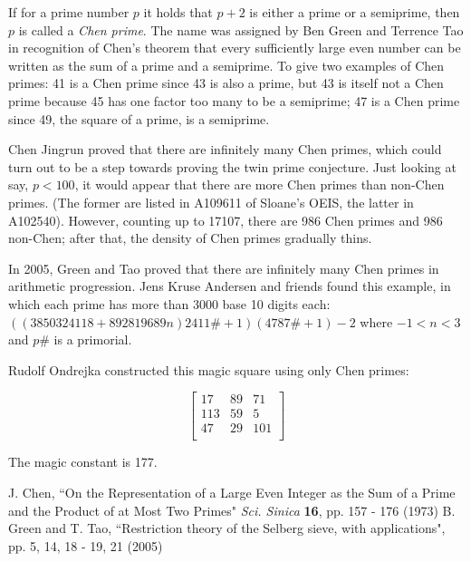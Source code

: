 \documentclass[12pt]{article}
\begin{document}
If for a prime number $p$ it holds that $p + 2$ is either a prime or a semiprime, then $p$ is called a {\em Chen prime}. The name was assigned by Ben Green and Terrence Tao in recognition of Chen's theorem that every sufficiently large even number can be written as the sum of a prime and a semiprime. To give two examples of Chen primes: 41 is a Chen prime since 43 is also a prime, but 43 is itself not a Chen prime because 45 has one factor too many to be a semiprime; 47 is a Chen prime since 49, the square of a prime, is a semiprime.

Chen Jingrun proved that there are infinitely many Chen primes, which could turn out to be a step towards proving the twin prime conjecture. Just looking at say, $p < 100$, it would appear that there are more Chen primes than non-Chen primes. (The former are listed in A109611 of Sloane's OEIS, the latter in A102540). However, counting up to 17107, there are 986 Chen primes and 986 non-Chen; after that, the density of Chen primes gradually thins.

In 2005, Green and Tao proved that there are infinitely many Chen primes in arithmetic progression. Jens Kruse Andersen and friends found this example, in which each prime has more than 3000 base 10 digits each: $((3850324118 + 892819689n)2411\# + 1)(4787\# + 1) - 2$ where $-1 < n < 3$ and $p\#$ is a primorial.

Rudolf Ondrejka constructed this magic square using only Chen primes:

$$\begin{bmatrix}
 17 & 89 & 71 \\
 113 & 59 & 5 \\
 47 & 29 & 101 \\
\end{bmatrix}$$

The magic constant is 177.

\begin{thebibliography}{2}
 J. Chen, ``On the Representation of a Large Even Integer as the Sum of a Prime and the Product of at Most Two Primes" {\it Sci. Sinica} {\bf 16}, pp. 157 - 176 (1973)
 B. Green and T. Tao, ``Restriction theory of the Selberg sieve, with applications", pp. 5, 14, 18 - 19, 21 (2005)
\end{thebibliography}
\end{document}
